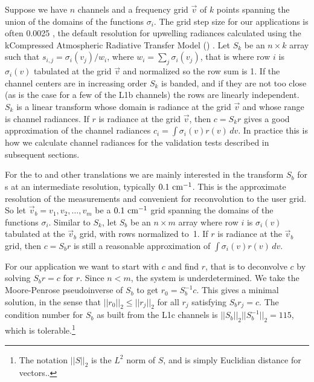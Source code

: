 \documentclass[journal]{IEEEtran}
\begin{document}
Suppose we have $n$ channels and a frequency grid $\vec v$ of $k$
points spanning the union of the domains of the functions
$\sigma_i$.  The grid step size for our applications is often 0.0025
{\wn}, the default resolution for upwelling radiances calculated
using the kCompressed Atmospheric Radiative Transfer Model (\kcarta)
\cite{kcarta1}.  Let $S_k$ be an $n\times k$ array such that
$s_{i,j} = \sigma_i(v_j)/w_i$, where $w_i = \sum_j \sigma_i(v_j)$,
that is where row $i$ is $\sigma_i(v)$ tabulated at the grid $\vec
v$ and normalized so the row sum is 1.  If the channel centers are
in increasing order $S_k$ is banded, and if they are not too close
(as is the case for a few of the L1b channels) the rows are linearly
independent.  $S_k$ is a linear transform whose domain is radiance
at the grid $\vec v$ and whose range is channel radiances.  If $r$
is radiance at the grid $\vec v$, then $c = S_k r$ gives a good
approximation of the channel radiances $c_i =
\int\sigma_i(v)r(v)\,dv$.  In practice this is how we calculate
{\airs} channel radiances for the validation tests described in
subsequent sections.


For the {\airs} to {\cris} and other translations we are mainly
interested in the transform $S_b$ for {\srf}s at an intermediate
resolution, typically $0.1~\mbox{cm$^{-1}$}$.  This is the approximate resolution
of the {\srf} measurements and convenient for reconvolution to the
{\cris} user grid.  So let $\vec v_b = v_1,v_2,\ldots,v_m$ be a
$0.1~\mbox{cm$^{-1}$}$ grid spanning the domains of the functions $\sigma_i$.
Similar to $S_k$, let $S_b$ be an $n\times m$ array where row $i$ is
$\sigma_i(v)$ tabulated at the $\vec v_b$ grid, with rows normalized
to~1.  If $r$ is radiance at the $\vec v_b$ grid, then $c = S_b r$
is still a reasonable approximation of $\int\sigma_i(v)r(v)\,dv$.

For our application we want to start with $c$ and find $r$, that is
to deconvolve $c$ by solving $S_b r = c$ for $r$.  Since $n < m$,
the system is underdetermined.  We take the Moore-Penrose
pseudoinverse \cite{wiki:pinv, strang:linalg} of $S_b$ to get $r_0 =
S_b^{-1} c$.  This gives a minimal solution, in the sense that
$||r_0||_2 \le ||r_j||_2$ for all $r_j$ satisfying $S_b r_j = c$.
The condition number for $S_b$ as built from the L1c channels is
$||S_b||_2||S_b^{-1}||_2 = 115$, which is tolerable.\footnote{The
  notation $||S||_2$ is the $L^2$ norm of $S$, and is simply
  Euclidian distance for vectors.\cite{wiki:norm}.}
\end{document}
